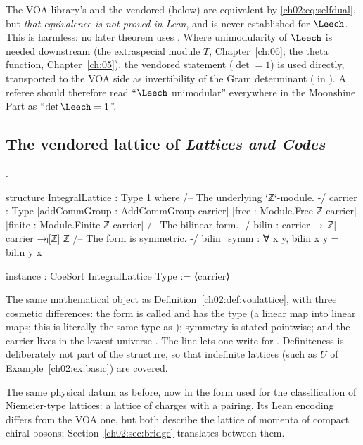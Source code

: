 \begin{warning}[title={Trap: \lean{SelfDual} is never connected to the Leech lattice}]
The VOA library's  and the vendored  (below) are equivalent by
\eqref{ch02:eq:selfdual}, but \emph{that equivalence is not proved in Lean}, and
 is never established for $\Leech$.  This is harmless: no later theorem uses
.  Where unimodularity of $\Leech$ is needed downstream (the
extraspecial module $T$, Chapter~\ref{ch:06}; the theta function, Chapter~\ref{ch:05}), the
vendored statement  ($\det=1$) is used directly, transported to
the VOA side as invertibility of the Gram determinant (
in ).  A referee should therefore read ``$\Leech$
unimodular'' everywhere in the Moonshine Part as ``$\det\Leech=1$''.
\end{warning}

\subsection{The vendored lattice of \emph{Lattices and Codes}}\label{ch02:sec:ebelinglattice}

\begin{definition}\label{ch02:def:ebelattice}
.
\end{definition}
\begin{leancode}
structure IntegralLattice : Type 1 where
  /-- The underlying `ℤ`-module. -/
  carrier : Type
  [addCommGroup : AddCommGroup carrier]
  [free : Module.Free ℤ carrier]
  [finite : Module.Finite ℤ carrier]
  /-- The bilinear form. -/
  bilin : carrier →ₗ[ℤ] carrier →ₗ[ℤ] ℤ
  /-- The form is symmetric. -/
  bilin_symm : ∀ x y, bilin x y = bilin y x

instance : CoeSort IntegralLattice Type := ⟨carrier⟩
\end{leancode}
\begin{dictionary}
The same mathematical object as Definition~\ref{ch02:def:voalattice}, with three cosmetic
differences: the form is called  and has the type 
(a linear map into linear maps; this is literally the same type as
); symmetry is stated pointwise; and the carrier lives in
the lowest universe .  The  line lets one write  for
.  Definiteness is deliberately not part of the structure, so that
indefinite lattices (such as $U$ of Example~\ref{ch02:ex:basic}) are covered.
\end{dictionary}
\begin{physics}
The same physical datum as before, now in the form used for the classification of Niemeier-type lattices: a lattice of charges with a pairing. Its Lean encoding differs from the VOA one, but both describe the lattice of momenta of compact chiral bosons; Section~\ref{ch02:sec:bridge} translates between them.
\end{physics}

